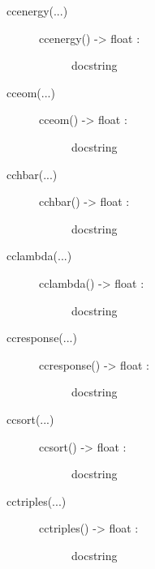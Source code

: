 \documentclass[letterpaper,10pt,english]{sphinxmanual}
\begin{document}
\begin{description}
\begin{description}
\begin{description}
\end{description}

\item[{ccenergy(...)}] \leavevmode\begin{description}
\item[{ccenergy() -\textgreater{} float :}] \leavevmode
docstring

\end{description}

\item[{cceom(...)}] \leavevmode\begin{description}
\item[{cceom() -\textgreater{} float :}] \leavevmode
docstring

\end{description}

\item[{cchbar(...)}] \leavevmode\begin{description}
\item[{cchbar() -\textgreater{} float :}] \leavevmode
docstring

\end{description}

\item[{cclambda(...)}] \leavevmode\begin{description}
\item[{cclambda() -\textgreater{} float :}] \leavevmode
docstring

\end{description}

\item[{ccresponse(...)}] \leavevmode\begin{description}
\item[{ccresponse() -\textgreater{} float :}] \leavevmode
docstring

\end{description}

\item[{ccsort(...)}] \leavevmode\begin{description}
\item[{ccsort() -\textgreater{} float :}] \leavevmode
docstring

\end{description}

\item[{cctriples(...)}] \leavevmode\begin{description}
\item[{cctriples() -\textgreater{} float :}] \leavevmode
docstring


\end{description}
\end{description}
\end{description}
\end{document}
